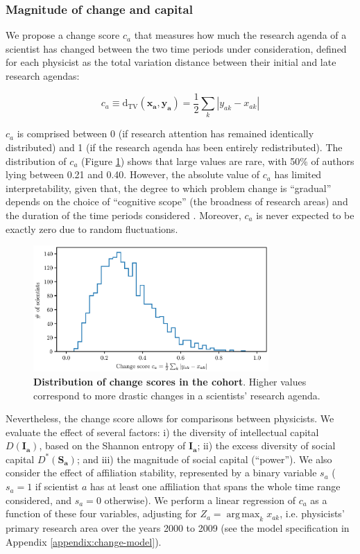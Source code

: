 \documentclass{article}
\DeclareMathOperator*{\argmax}{arg\,max}
\begin{document}
\subsubsection{Magnitude of change and capital}

We propose a change score $c_a$ that measures how much the research agenda of a scientist has changed between the two time periods under consideration, defined for each physicist as the total variation distance between their initial and late research agendas:

\begin{equation}
    c_a \equiv \mathrm{d}_{\text{TV}}(\bm{x_a},\bm{y_a}) = \frac{1}{2} \sum_k |y_{ak}-x_{ak}|
\end{equation}

$c_a$ is comprised between 0 (if research attention has remained identically distributed) and 1 (if the research agenda has been entirely redistributed). The distribution of $c_a$ (Figure \ref{fig:change_scores}) shows that large values are rare, with 50\% of authors lying between 0.21 and 0.40. However, the absolute value of $c_a$ has limited interpretability, given that, the degree to which problem change is ``gradual'' depends on the choice of ``cognitive scope'' (the broadness of research areas) and the duration of the time periods considered  \citep{Gieryn1978}. Moreover, $c_a$ is never expected to be exactly zero due to random fluctuations.

\begin{figure}[h]
    \centering
        \includegraphics[width=0.8\textwidth]{plots/change_score.eps}
    \caption{\textbf{Distribution of change scores in the cohort}. Higher values correspond to more drastic changes in a scientists' research agenda.}    
    \label{fig:change_scores}
\end{figure}

Nevertheless, the change score allows for comparisons between physicists. We evaluate the effect of several factors: i) the diversity of intellectual capital $D(\bm{I_a})$, based on the Shannon entropy of $\bm{I_a}$; ii) the excess diversity of social capital $D^{\ast}(\bm{S_a})$; and iii) the magnitude of social capital (``power''). We also consider the effect of affiliation stability, represented by a binary variable $s_a$ ($s_a=1$ if scientist $a$ has at least one affiliation that spans the whole time range considered, and $s_a=0$ otherwise). We perform a linear regression of $c_a$ as a function of these four variables, adjusting for $Z_a=\argmax_{k} x_{ak}$, i.e. physicists' primary research area over the years 2000 to 2009 (see the model specification in Appendix \ref{appendix:change-model}).
\end{document}

